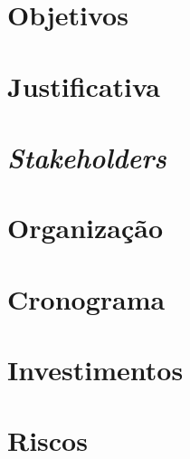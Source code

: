 \section{Objetivos}

\section{Justificativa}

\section{\textit{Stakeholders}}

\section{Organização}

\section{Cronograma}

\section{Investimentos}

\section{Riscos}
